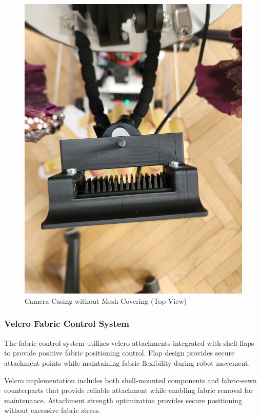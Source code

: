\begin{figure}[H]
\begin{minipage}{0.45\textwidth}
        \includegraphics[width=\textwidth, angle=-90]{Images/CameraCasingNoMesh (3).jpg}
        \caption{Camera Casing without Mesh Covering (Top View)}
        \label{fig:camera_casing_no_mesh_top}
    \end{minipage}
\end{figure}

\subsubsection{Velcro Fabric Control System}

The fabric control system utilizes velcro attachments integrated with shell flaps to provide positive fabric positioning control. Flap design provides secure attachment points while maintaining fabric flexibility during robot movement.

Velcro implementation includes both shell-mounted components and fabric-sewn counterparts that provide reliable attachment while enabling fabric removal for maintenance. Attachment strength optimization provides secure positioning without excessive fabric stress.


